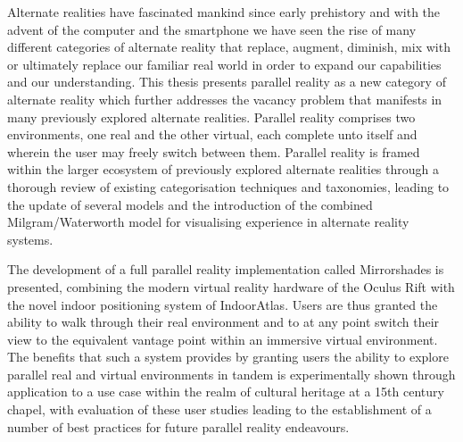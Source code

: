 Alternate realities have fascinated mankind since early prehistory and with the advent of the computer and the smartphone we have seen the rise of many different categories of alternate reality that replace, augment, diminish, mix with or ultimately replace our familiar real world in order to expand our capabilities and our understanding. This thesis presents parallel reality as a new category of alternate reality which further addresses the vacancy problem that manifests in many previously explored alternate realities. Parallel reality comprises two environments, one real and the other virtual, each complete unto itself and wherein the user may freely switch between them. Parallel reality is framed within the larger ecosystem of previously explored alternate realities through a thorough review of existing categorisation techniques and taxonomies, leading to the update of several models and the introduction of the combined Milgram/Waterworth model for visualising experience in alternate reality systems.

The development of a full parallel reality implementation called Mirrorshades is presented, combining the modern virtual reality hardware of the Oculus Rift with the novel indoor positioning system of IndoorAtlas. Users are thus granted the ability to walk through their real environment and to at any point switch their view to the equivalent vantage point within an immersive virtual environment. The benefits that such a system provides by granting users the ability to explore parallel real and virtual environments in tandem is experimentally shown through application to a use case within the realm of cultural heritage at a 15th century chapel, with evaluation of these user studies leading to the establishment of a number of best practices for future parallel reality endeavours.